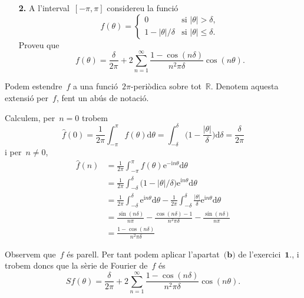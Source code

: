 \documentclass[a4paper]{article}
\newcommand{\iu}{\mathrm{i}}
\newcommand{\e}{\mathrm{e}}
\newcommand{\uppi}{\pi}
\newcommand{\diff}{\mathrm{d}}
\newcommand{\abs}[1]{\lvert{#1}\rvert}
\begin{document}
\clearpage
\begin{enumerate}
    \item[\textbf{2.}] A l'interval~\([-\uppi, \uppi]\) considereu la funció
        \[
            f(\theta) =
            \begin{cases}
                0 & \text{si } \abs{\theta} > \delta, \\
                1 - \abs{\theta}/\delta & \text{si } \abs{\theta} \leq \delta.
            \end{cases}
        \]
        Proveu que
        \[
            f(\theta) = \frac{\delta}{2\uppi}
            + 2 \sum_{n = 1}^{\infty}
            \frac{1-\cos(n\delta)}{n^{2}\uppi\delta} \cos(n\theta).
        \]
\end{enumerate}
Podem estendre~\(f\) a una funció~\(2\uppi\)-periòdica sobre
tot~\(\mathbb{R}\).
Denotem aquesta extensió per~\(f\), fent un abús de notació.

Calculem, per~\(n = 0\) trobem
\[
    \widehat{f}(0) = \frac{1}{2\uppi}
                     \int_{-\uppi}^{\uppi}f(\theta)\diff\theta
                   = \int_{-\delta}^{\delta}
                     \biggl(1 - \frac{\abs{\theta}}{\delta}\biggr)
                     \diff\delta
                   = \frac{\delta}{2\uppi}
\]
i per~\(n \neq 0\),
\begin{align*}
    \widehat{f}(n) &= \frac{1}{2\uppi} \int_{-\uppi}^{\uppi}
                      f(\theta) \e^{-\iu n\theta}
                      \diff \theta \\
                   &= \frac{1}{2\uppi} \int_{-\delta}^{\delta}
                      \bigl(1 - \abs{\theta}/\delta\bigr)
                      \e^{\iu n\theta}
                      \diff \theta \\
                   &= \frac{1}{2\uppi} \int_{-\delta}^{\delta}
                      \e^{\iu n\theta}
                      \diff \theta
                      - \frac{1}{2\uppi} \int_{-\delta}^{\delta}
                      \frac{\abs{\theta}}{\delta} \e^{\iu n\theta}
                      \diff \theta \\
                   &= \frac{\sin(n\delta)}{n\uppi}
                      - \frac{\cos(n\delta) - 1}{n^{2}\uppi\delta}
                      - \frac{\sin(n\delta)}{n\uppi} \\
                   &= \frac{1 - \cos(n\delta)}{n^{2}\uppi\delta}
\end{align*}

Observem que~\(f\) és parell. Per tant podem aplicar l'apartat~\(\textbf{(b)}\)
de l'exercici~\(\textbf{1.}\), i trobem doncs que la sèrie de Fourier de~\(f\)
és
\[
    Sf(\theta) = \frac{\delta}{2\uppi}
    + 2 \sum_{n = 1}^{\infty}
    \frac{1-\cos(n\delta)}{n^{2}\uppi\delta} \cos(n\theta).
\]
\end{document}
